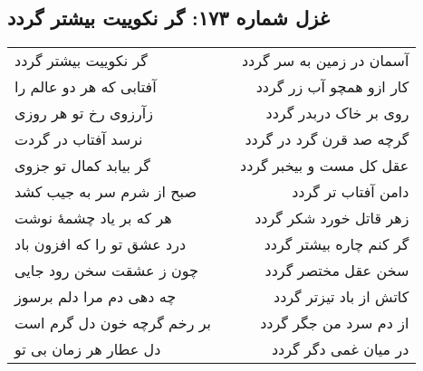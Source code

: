 \begin{center}
\section*{غزل شماره ۱۷۳: گر نکوییت بیشتر گردد}
\label{sec:173}
\begin{longtable}{l p{0.5cm} r}
گر نکوییت بیشتر گردد
&&
آسمان در زمین به سر گردد
\\
آفتابی که هر دو عالم را
&&
کار ازو همچو آب زر گردد
\\
زآرزوی رخ تو هر روزی
&&
روی بر خاک دربدر گردد
\\
نرسد آفتاب در گردت
&&
گرچه صد قرن گرد در گردد
\\
گر بیابد کمال تو جزوی
&&
عقل کل مست و بیخبر گردد
\\
صبح از شرم سر به جیب کشد
&&
دامن آفتاب تر گردد
\\
هر که بر یاد چشمهٔ نوشت
&&
زهر قاتل خورد شکر گردد
\\
درد عشق تو را که افزون باد
&&
گر کنم چاره بیشتر گردد
\\
چون ز عشقت سخن رود جایی
&&
سخن عقل مختصر گردد
\\
چه دهی دم مرا دلم برسوز
&&
کاتش از باد تیزتر گردد
\\
بر رخم گرچه خون دل گرم است
&&
از دم سرد من جگر گردد
\\
دل عطار هر زمان بی تو
&&
در میان غمی دگر گردد
\\
\end{longtable}
\end{center}
